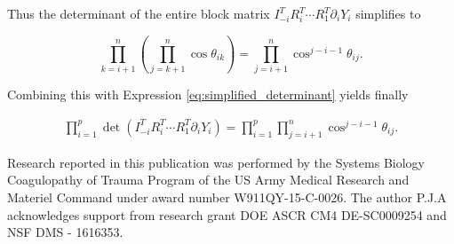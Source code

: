 \documentclass[ba]{imsart}
\numberwithin{equation}{section}
\theoremstyle{plain}
\begin{document}
\noindent Thus the determinant of the entire block matrix $I_{-i}^T R_i^T \cdots R_1^T \partial_{i} Y_i $ simplifies to

\begin{equation}
\prod_{k=i+1}^n \left( \prod_{j=k+1}^n \cos \theta_{ik} \right) = \prod_{j=i+1}^n \cos^{j-i-1} \theta_{ij}.
\end{equation}

\noindent Combining this with Expression \ref{eq:simplified_determinant} yields finally

\begin{eqnarray}
\prod_{i=1}^p \det \left( I_{-i}^T R_i^T \cdots R_1^T \partial_{i} Y_i \right) = \prod_{i=1}^p \prod_{j=i+1}^n \cos^{j-i-1} \theta_{ij}.
\end{eqnarray}




Research reported in this publication was performed by the Systems Biology Coagulopathy of Trauma Program of the US Army Medical Research and Materiel Command under award number W911QY-15-C-0026. The author P.J.A acknowledges support from research grant DOE ASCR CM4 DE-SC0009254 and NSF DMS - 1616353.
\end{document}

